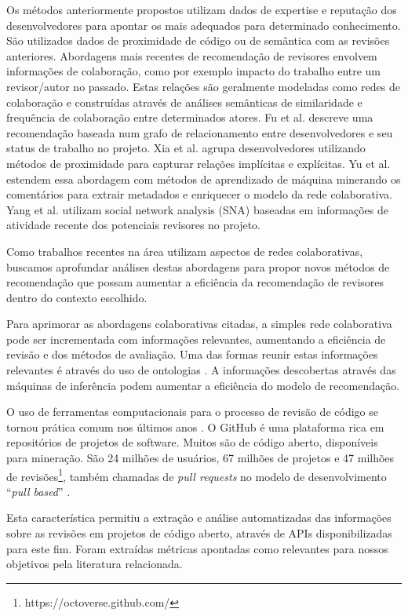 \documentclass[a4paper,12pt]{monografia}
\theoremstyle{plain}
\theoremstyle{definition}
\theoremstyle{remark}
\begin{document}
Os métodos anteriormente propostos utilizam dados de expertise e reputação dos desenvolvedores para apontar os mais adequados para determinado conhecimento. São utilizados dados de proximidade de código ou de semântica com as revisões anteriores. Abordagens mais recentes de recomendação de revisores envolvem informações de colaboração, como por exemplo impacto do trabalho entre um revisor/autor no passado. Estas relações são geralmente modeladas como redes de colaboração e construídas através de análises semânticas de similaridade e frequência de colaboração entre determinados atores. Fu et al. \cite{fu2017} descreve uma recomendação baseada num grafo de relacionamento entre desenvolvedores e seu status de trabalho no projeto. Xia et al. \cite{xia2017} agrupa desenvolvedores utilizando métodos de proximidade para capturar relações implícitas e explícitas. Yu et al. \cite{yu2014,yu2014-2} estendem essa abordagem com métodos de aprendizado de máquina minerando os comentários para extrair metadados e enriquecer o modelo da rede colaborativa. Yang et al. \cite{yang2016} utilizam social network analysis (SNA) baseadas em informações de atividade recente dos potenciais revisores no projeto.

Como trabalhos recentes na área utilizam aspectos de redes colaborativas, buscamos aprofundar análises destas abordagens para propor novos métodos de recomendação que possam aumentar a eficiência da recomendação de revisores dentro do contexto escolhido.

Para aprimorar as abordagens colaborativas citadas, a simples rede colaborativa pode ser incrementada com informações relevantes, aumentando a eficiência de revisão e dos métodos de avaliação. Uma das formas reunir estas informações relevantes é através do uso de ontologias \cite{middleton2001,middleton2004}. A informações descobertas através das máquinas de inferência podem aumentar a eficiência do modelo de recomendação.

O uso de ferramentas computacionais para o processo de revisão de código se tornou prática comum nos últimos anos \cite{Bacchelli2013}. O GitHub é uma plataforma rica em repositórios de projetos de software. Muitos são de código aberto, disponíveis para mineração. São 24 milhões de usuários, 67 milhões de projetos e 47 milhões de revisões\footnote{https://octoverse.github.com/}, também chamadas de \textit{pull requests} no modelo de desenvolvimento ``\textit{pull based}'' \cite{gousios2014}.

Esta característica permitiu a extração e análise automatizadas das informações sobre as revisões em projetos de código aberto, através de APIs disponibilizadas para este fim. Foram extraídas métricas apontadas como relevantes para nossos objetivos pela literatura relacionada.
\end{document}
